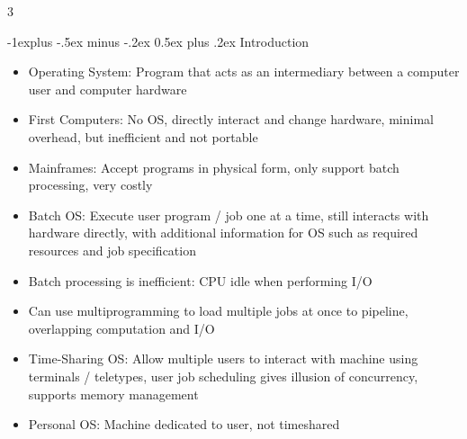 \documentclass[10pt, landscape]{article}
\makeatletter
\renewcommand{\section}{\@startsection{section}{1}{0mm}%
                                {-1ex plus -.5ex minus -.2ex}%
                                {0.5ex plus .2ex}%
                                {\normalfont\large\bfseries}}
\renewcommand{\section}{\@startsection{section}{2}{0mm}%
                                {-1explus -.5ex minus -.2ex}%
                                {0.5ex plus .2ex}%
                                {\normalfont\normalsize\bfseries}}
\makeatother
\begin{document}
\raggedright
\footnotesize
\begin{multicols*}{3}

\setlength{\columnseprule}{0.25pt}
\setlength{\premulticols}{1pt}
\setlength{\postmulticols}{1pt}
\setlength{\multicolsep}{1pt}
\setlength{\columnsep}{2pt}

\begin{center}
\end{center}

\section{Introduction}
\begin{itemize}
    \item Operating System: Program that acts as an intermediary between a computer user and computer hardware
    \item First Computers: No OS, directly interact and change hardware, minimal overhead, but inefficient and not portable
    \item Mainframes: Accept programs in physical form, only support batch processing, very costly
    \item Batch OS: Execute user program / job one at a time, still interacts with hardware directly, with additional information for OS such as required resources and job specification
    \item Batch processing is inefficient: CPU idle when performing I/O
    \item Can use multiprogramming to load multiple jobs at once to pipeline, overlapping computation and I/O
    \item Time-Sharing OS: Allow multiple users to interact with machine using terminals / teletypes, user job scheduling gives illusion of concurrency, supports memory management
    \item Personal OS: Machine dedicated to user, not timeshared
\end{itemize}


\end{multicols*}
\end{document}
